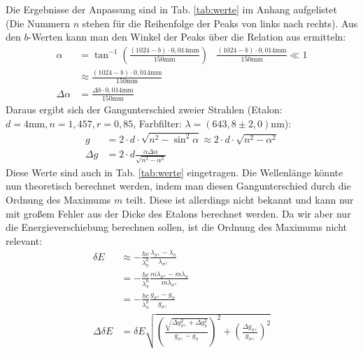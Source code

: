 Die Ergebnisse der Anpassung sind in Tab. \ref{tab:werte} im Anhang aufgelistet (Die Nummern $n$ stehen für die Reihenfolge der Peaks von links nach rechts). Aus den $b$-Werten kann man den Winkel der Peaks über die Relation aus \cite{praktikumsheft} ermitteln:
\begin{align*}
\alpha &= \tan^{-1}\left(\frac{(1024-b)\cdot 0,014\si{\milli\meter}}{150\si{\milli\meter}}\right) & \frac{(1024-b)\cdot 0,014\si{\milli\meter}}{150\si{\milli\meter}} \ll 1\\
&\approx \frac{(1024-b)\cdot 0,014\si{\milli\meter}}{150\si{\milli\meter}}\\
\Delta \alpha &= \frac{\Delta b\cdot 0,014\si{\milli\meter}}{150\si{\milli\meter}}
\end{align*}   
Daraus ergibt sich der Gangunterschied zweier Strahlen (Etalon: $d = 4\si{\milli\meter}, n = 1,457, r = 0,85$, Farbfilter: $\lambda = (643,8\pm 2,0) \si{\nano\meter}$):
\begin{align*}
g &= 2\cdot d \cdot \sqrt{n^2 - \sin^2{\alpha}} \approx 2\cdot d \cdot \sqrt{n^2 - \alpha^2}\\
\Delta g &= 2\cdot d \frac{\alpha \Delta\alpha}{\sqrt{n^2 - \alpha^2}}
\end{align*}
Diese Werte sind auch in Tab. \ref{tab:werte} eingetragen. Die Wellenlänge könnte nun theoretisch berechnet werden, indem man diesen Gangunterschied durch die Ordnung des Maximums $m$ teilt. Diese ist allerdings nicht bekannt und kann nur mit großem Fehler aus der Dicke des Etalons berechnet werden. Da wir aber nur die Energieverschiebung berechnen sollen, ist die Ordnung des Maximums nicht relevant:
\begin{align*}
\delta E &\approx -\frac{hc}{\lambda_\pi^0} \frac{\lambda_{\sigma^\pm} - \lambda_\pi}{\lambda_{\sigma^\pm}}\\
	&= -\frac{hc}{\lambda_\pi^0} \frac{m \lambda_{\sigma^\pm} - m \lambda_\pi}{m\lambda_{\sigma^\pm}}\\
	& = -\frac{hc}{\lambda_\pi^0} \frac{g_{\sigma^\pm} - g_\pi}{g_{\sigma^\pm}}\\
\Delta \delta E &= \delta E \sqrt{\left(\frac{\sqrt{\Delta g_{\sigma^\pm}^2 + \Delta g_\pi^2}}{g_{\sigma^\pm} - g_\pi}\right)^2 + \left(\frac{\Delta g_{\sigma^\pm}}{g_{\sigma^\pm}}\right)^2}
\end{align*}

